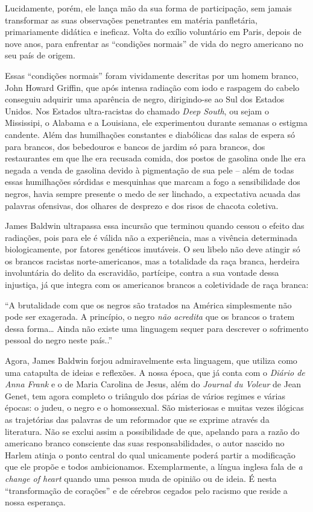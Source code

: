\documentclass[
  letterpaper,
  DIV=11,
  numbers=noendperiod]{scrreprt}
\begin{document}
Lucidamente, porém, ele lança mão da sua forma de participação, sem
jamais transformar as suas observações penetrantes em matéria
panfletária, primariamente didática e ineficaz. Volta do exílio
voluntário em Paris, depois de nove anos, para enfrentar as ``condições
normais'' de vida do negro americano no seu país de origem.

Essas ``condições normais'' foram vividamente descritas por um homem
branco, John Howard Griffin, que após intensa radiação com iodo e
raspagem do cabelo conseguiu adquirir uma aparência de negro,
dirigindo-se ao Sul dos Estados Unidos. Nos Estados ultra-racistas do
chamado \emph{Deep South}, ou sejam o Mississipi, o Alabama e a
Louisiana, ele experimentou durante semanas o estigma candente. Além das
humilhações constantes e diabólicas das salas de espera só para brancos,
dos bebedouros e bancos de jardim só para brancos, dos restaurantes em
que lhe era recusada comida, dos postos de gasolina onde lhe era negada
a venda de gasolina devido à pigmentação de sua pele -- além de todas
essas humilhações sórdidas e mesquinhas que marcam a fogo a
sensibilidade dos negros, havia sempre presente o medo de ser linchado,
a expectativa acuada das palavras ofensivas, dos olhares de desprezo e
dos risos de chacota coletiva.

James Baldwin ultrapassa essa incursão que terminou quando cessou o
efeito das radiações, pois para ele é válida não a experiência, mas a
vivência determinada biologicamente, por fatores genéticos imutáveis. O
seu libelo não deve atingir só os brancos racistas norte-americanos, mas
a totalidade da raça branca, herdeira involuntária do delito da
escravidão, partícipe, contra a sua vontade dessa injustiça, já que
integra com os americanos brancos a coletividade de raça branca:

``A brutalidade com que os negros são tratados na América simplesmente
não pode ser exagerada. A princípio, o negro \emph{não acredita} que os
brancos o tratem dessa forma\ldots{} Ainda não existe uma linguagem
sequer para descrever o sofrimento pessoal do negro neste país..''

Agora, James Baldwin forjou admiravelmente esta linguagem, que utiliza
como uma catapulta de ideias e reflexões. A nossa época, que já conta
com o \emph{Diário de Anna Frank} e o de Maria Carolina de Jesus, além
do \emph{Journal du Voleur} de Jean Genet, tem agora completo o
triângulo dos párias de vários regimes e várias épocas: o judeu, o negro
e o homossexual. São misteriosas e muitas vezes ilógicas as trajetórias
das palavras de um reformador que se exprime através da literatura. Não
se exclui assim a possibilidade de que, apelando para a razão do
americano branco consciente das suas responsabilidades, o autor nascido
no Harlem atinja o ponto central do qual unicamente poderá partir a
modificação que ele propõe e todos ambicionamos. Exemplarmente, a língua
inglesa fala de \emph{a change of heart} quando uma pessoa muda de
opinião ou de ideia. É nesta ``transformação de corações'' e de cérebros
cegados pelo racismo que reside a nossa esperança.
\end{document}
